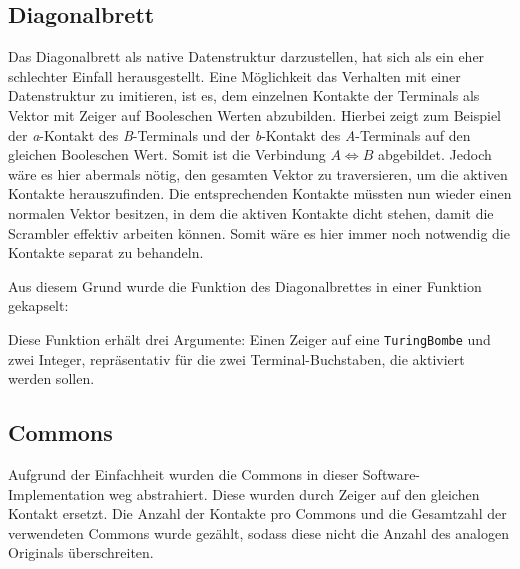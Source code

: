 
\subsection{Diagonalbrett}\label{subsec:impl_diagonal_board}
Das Diagonalbrett als native Datenstruktur darzustellen, hat sich als ein eher schlechter Einfall herausgestellt.
Eine Möglichkeit das Verhalten mit einer Datenstruktur zu imitieren, ist es, dem einzelnen Kontakte der Terminals als Vektor mit Zeiger auf Booleschen Werten abzubilden.
Hierbei zeigt zum Beispiel der \emph{a}-Kontakt des \emph{B}-Terminals und der \emph{b}-Kontakt des \emph{A}-Terminals auf den gleichen Booleschen Wert.
Somit ist die Verbindung $A \Leftrightarrow B$ abgebildet.
Jedoch wäre es hier abermals nötig, den gesamten Vektor zu traversieren, um die aktiven Kontakte herauszufinden.
Die entsprechenden Kontakte müssten nun wieder einen normalen Vektor besitzen, in dem die aktiven Kontakte \glqq dicht\grqq{} stehen, damit die Scrambler effektiv arbeiten können.
Somit wäre es hier immer noch notwendig die Kontakte separat zu behandeln.

Aus diesem Grund wurde die Funktion des Diagonalbrettes in einer Funktion gekapselt:

\noindent

Diese Funktion erhält drei Argumente: Einen Zeiger auf eine \texttt{TuringBombe} und zwei Integer, repräsentativ für die zwei Terminal-Buchstaben, die aktiviert werden sollen.


\subsection{Commons}\label{subsec:impl_commons}
Aufgrund der Einfachheit wurden die Commons in dieser Software-Implementation \glqq weg abstrahiert\grqq.
Diese wurden durch Zeiger auf den gleichen Kontakt ersetzt.
Die Anzahl der Kontakte pro Commons und die Gesamtzahl der verwendeten Commons wurde gezählt, sodass diese nicht die Anzahl des analogen Originals überschreiten.

